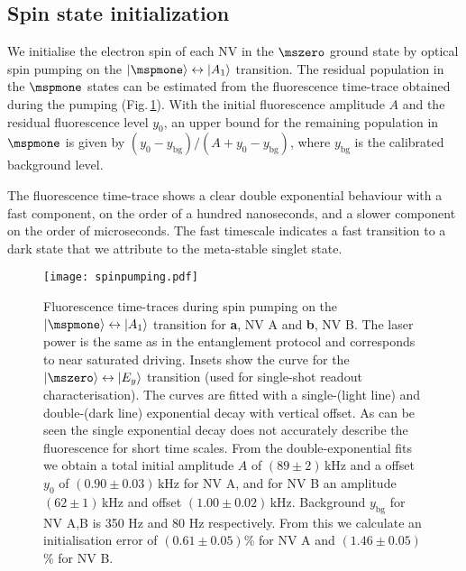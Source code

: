 \subsection{Spin state initialization}
We initialise the electron spin of each NV in the $\mszero$ ground state by optical spin pumping on the $\ket{\mspmone}\leftrightarrow\ket{A_1}$ transition. The residual population in the $\mspmone$ states can be estimated from the fluorescence time-trace obtained during the pumping (Fig.\,\ref{fig:spinpumping}). With the initial fluorescence amplitude $A$ and the residual fluorescence level $y_0$, an upper bound for the remaining population in $\mspmone$ is given by $(y_0-y_{\mathrm{bg}})/(A+y_0-y_{\mathrm{bg}})$, where $y_{\mathrm{bg}}$ is the calibrated background level\cite{Robledo:2011fs}.

The fluorescence time-trace shows a clear double exponential behaviour with a fast component, on the order of a hundred nanoseconds, and a slower component on the order of microseconds. The fast timescale indicates a fast transition to a dark state that we attribute to the meta-stable singlet state.

\begin{figure}[h]
\centering
\texttt{[image: spinpumping.pdf]}
\caption{Fluorescence time-traces during spin pumping on the $\ket{\mspmone}\leftrightarrow\ket{A_1}$ transition for {\bf a}, NV A and {\bf b}, NV B. The laser power is the same as in the entanglement protocol and corresponds to near saturated driving. Insets show the curve for the $\ket{\mszero}\leftrightarrow\ket{E_y}$ transition (used for single-shot readout characterisation). The curves are fitted with a single-(light line) and double-(dark line) exponential decay with vertical offset. As can be seen the single exponential decay does not accurately describe the fluorescence for short time scales. From the double-exponential fits we obtain a total initial amplitude $A$ of $(89 \pm 2)$\,kHz and a offset $y_0$ of $(0.90 \pm 0.03)$\,kHz for NV A, and for NV B an amplitude $(62 \pm 1)$\,kHz and offset $(1.00 \pm 0.02)$\,kHz. Background $y_{\mathrm{bg}}$ for NV A,B is 350 Hz and 80 Hz respectively. From this we calculate an initialisation error of $(0.61 \pm 0.05)$\% for NV A and $(1.46 \pm 0.05)$\% for NV B. }
\label{fig:spinpumping}
\end{figure}

